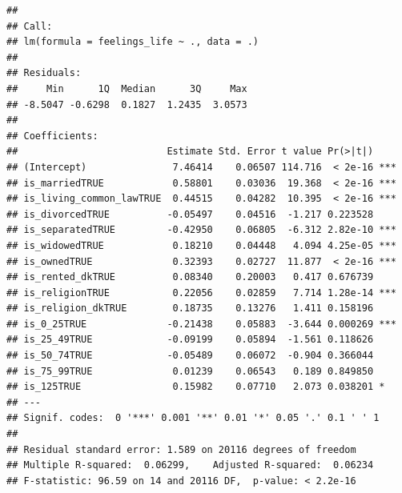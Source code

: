 \documentclass[]{article}
\begin{document}
\begin{verbatim}
## 
## Call:
## lm(formula = feelings_life ~ ., data = .)
## 
## Residuals:
##     Min      1Q  Median      3Q     Max 
## -8.5047 -0.6298  0.1827  1.2435  3.0573 
## 
## Coefficients:
##                          Estimate Std. Error t value Pr(>|t|)    
## (Intercept)               7.46414    0.06507 114.716  < 2e-16 ***
## is_marriedTRUE            0.58801    0.03036  19.368  < 2e-16 ***
## is_living_common_lawTRUE  0.44515    0.04282  10.395  < 2e-16 ***
## is_divorcedTRUE          -0.05497    0.04516  -1.217 0.223528    
## is_separatedTRUE         -0.42950    0.06805  -6.312 2.82e-10 ***
## is_widowedTRUE            0.18210    0.04448   4.094 4.25e-05 ***
## is_ownedTRUE              0.32393    0.02727  11.877  < 2e-16 ***
## is_rented_dkTRUE          0.08340    0.20003   0.417 0.676739    
## is_religionTRUE           0.22056    0.02859   7.714 1.28e-14 ***
## is_religion_dkTRUE        0.18735    0.13276   1.411 0.158196    
## is_0_25TRUE              -0.21438    0.05883  -3.644 0.000269 ***
## is_25_49TRUE             -0.09199    0.05894  -1.561 0.118626    
## is_50_74TRUE             -0.05489    0.06072  -0.904 0.366044    
## is_75_99TRUE              0.01239    0.06543   0.189 0.849850    
## is_125TRUE                0.15982    0.07710   2.073 0.038201 *  
## ---
## Signif. codes:  0 '***' 0.001 '**' 0.01 '*' 0.05 '.' 0.1 ' ' 1
## 
## Residual standard error: 1.589 on 20116 degrees of freedom
## Multiple R-squared:  0.06299,    Adjusted R-squared:  0.06234 
## F-statistic: 96.59 on 14 and 20116 DF,  p-value: < 2.2e-16
\end{verbatim}
\end{document}
